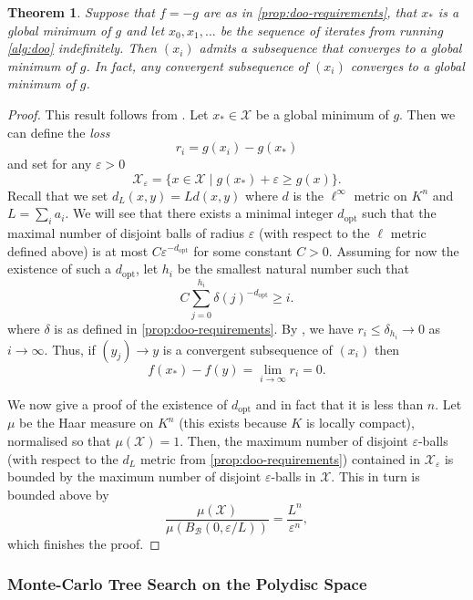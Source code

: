 \documentclass[10pt]{article}
\newtheorem{theorem}{Theorem}[]
\theoremstyle{definition}
\begin{document}
\begin{theorem}
    \label{thm:doo}
    Suppose that $f = -g$ are as in \cref{prop:doo-requirements}, that $x_*$ is a global minimum of $g$ and let $x_0, x_1, \dotsc$ be the sequence of iterates from running \cref{alg:doo} indefinitely. Then $(x_i)$ admits a subsequence that converges to a global minimum of $g$. In fact, any convergent subsequence of $(x_i)$ converges to a global minimum of $g$.
\end{theorem}

\begin{proof}
    This result follows from \cite[Theorem 1]{munos2011optimistic}. Let $x_* \in \mathcal X$ be a global minimum of $g$. Then we can define the \emph{loss}
    $$
        r_i = g(x_i) - g(x_*)
    $$
    and set for any $\varepsilon > 0$
    $$
        \mathcal X_\varepsilon = \{ x \in \mathcal X \mid g(x_*) + \varepsilon \ge g(x) \}.
    $$
    Recall that we set $d_L(x, y) = Ld(x, y)$ where $d$ is the $\ell^\infty$ metric on $K^n$ and $L = \sum_i a_i$.
    We will see that there exists a minimal integer $d_\mathrm{opt}$ such that the maximal number of disjoint balls of radius $\varepsilon$ (with respect to the $\ell$ metric defined above) is at most $C\varepsilon^{-d_\mathrm{opt}}$ for some constant $C > 0$.
    Assuming for now the existence of such a $d_\mathrm{opt}$, let $h_i$ be the smallest natural number such that
    $$
        C \sum_{j=0}^{h_i} \delta(j)^{-d_\mathrm{opt}} \ge i.
    $$
    where $\delta$ is as defined in \cref{prop:doo-requirements}.
    By \cite[Theorem 1]{munos2011optimistic}, we have $r_i \le \delta_{h_i} \to 0$ as $i \to \infty$.
    Thus, if $(y_j) \to y$ is a convergent subsequence of $(x_i)$ then 
    $$f(x_*) - f(y) = \lim_{i \to \infty} r_i = 0.$$

    We now give a proof of the existence of $d_\mathrm{opt}$ and in fact that it is less than $n$. Let $\mu$ be the Haar measure on $K^n$ (this exists because $K$ is locally compact), normalised so that $\mu(\mathcal X) = 1$. Then, the maximum number of disjoint $\varepsilon$-balls (with respect to the $d_L$ metric from \cref{prop:doo-requirements}) contained in $\mathcal X_\varepsilon$ is bounded by the maximum number of disjoint $\varepsilon$-balls in $\mathcal X$. This in turn is bounded above by
    $$
        \frac{\mu(\mathcal X)}{\mu(B_\mathcal{B}(0, \varepsilon / L))} = \frac{L^n}{\varepsilon^n},
    $$
    which finishes the proof.
\end{proof}

\subsubsection{Monte-Carlo Tree Search on the Polydisc Space} \label{subsec:mcts}
\end{document}
